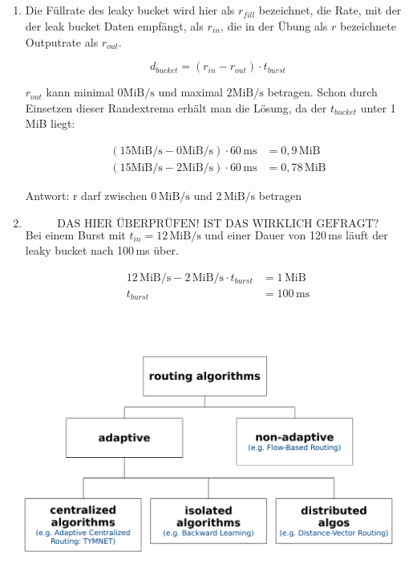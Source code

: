 \documentclass[a4paper,
			llpt,
			solution,
			accentcolor=tud2d,
			colorbacktitle
			]
			{tudexercise}
\newcommand{\MiBs}{\mathrm{MiB}/\mathrm{s}}
\begin{document}
\subsection{}
\begin{enumerate}
\item
Die Füllrate des leaky bucket wird hier als $r_{fill}$ bezeichnet, die Rate, mit der der leak bucket Daten empfängt, als $r_{in}$, die in der Übung als $r$ bezeichnete Outputrate als $r_{out}$.

$$d_{bucket} = \left(r_{in} - r_{out}\right) \cdot t_{burst}$$

$r_{out}$ kann minimal $0\MiBs$ und maximal $2\MiBs$ betragen. Schon durch Einsetzen dieser Randextrema erhält man die Lösung, da der $t_{bucket}$ unter 1\,MiB liegt:

\begin{align*}
\left(15\MiBs - 0\MiBs\right) \cdot 60\mathrm{\,ms} &= 0,9\mathrm{ \,MiB}\\
\left(15\MiBs - 2\MiBs\right) \cdot 60\mathrm{\,ms} &= 0,78\mathrm{\,MiB}
\end{align*}

Antwort: r darf zwischen 0\,$\MiBs$ und 2\,$\MiBs$ betragen

\item
$$\text{DAS HIER ÜBERPRÜFEN! IST DAS WIRKLICH GEFRAGT?}$$
Bei einem Burst mit $t_{in} = 12\,\MiBs$ und einer Dauer von 120\,ms läuft der leaky bucket nach 100\,ms über.

\begin{align*}
12\, \MiBs - 2\, \MiBs \cdot t_{burst} &= 1\,\mathrm{MiB} \\
t_{burst} &= 100\,\mathrm{ms}
\end{align*}

\end{enumerate}

\section{}
\subsection{}
  \begin{center}
    \includegraphics[scale=0.6]{2_3_1.pdf}
  \end{center}
\end{document}

